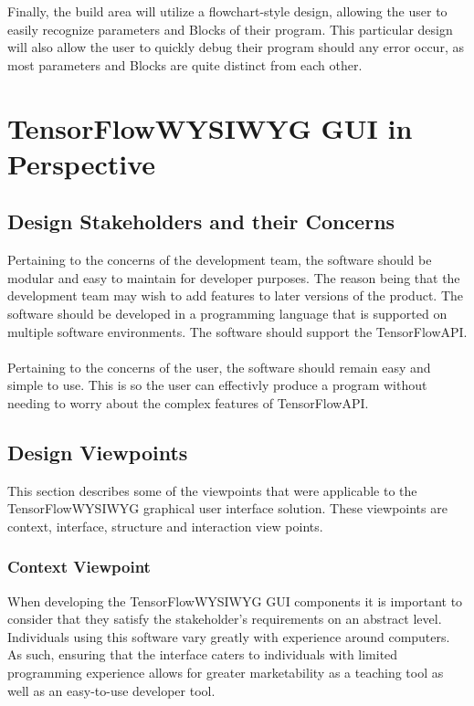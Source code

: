 \documentclass[journal,10pt,onecolumn,compsoc]{IEEEtran} \usepackage[margin=1.0in]{geometry} \usepackage{pdfpages}
\begin{document}
\noindent Finally, the build area will utilize a flowchart-style design, allowing the user to easily recognize parameters and Blocks of their program. 
This particular design will also allow the user to quickly debug their program should any error occur, as most parameters and Blocks are quite distinct from each other.
\newpage
\section{TensorFlow\texttrademark WYSIWYG GUI in Perspective}\label{TWYSIWYGGUI}
\subsection{Design Stakeholders and their Concerns}
\noindent Pertaining to the concerns of the development team, the software should be modular and easy to maintain for developer purposes. 
The reason being that the development team may wish to add features to later versions of the product.
The software should be developed in a programming language that is supported on multiple software environments.
The software should support the TensorFlow\texttrademark API.
\\ \\
\noindent Pertaining to the concerns of the user, the software should remain easy and simple to use. This is so the user can effectivly produce a program without needing to worry about the complex features of TensorFlow\texttrademark API. 
\subsection{Design Viewpoints}
This section describes some of the viewpoints that were applicable to the TensorFlow\texttrademark WYSIWYG graphical user interface solution. 
These viewpoints are context, interface, structure and interaction view points.

\subsubsection{Context Viewpoint}
\noindent When developing the TensorFlow\texttrademark WYSIWYG GUI components it is important to consider that they satisfy the stakeholder's requirements on an abstract level. 
Individuals using this software vary greatly with experience around computers. 
As such, ensuring that the interface caters to individuals with limited programming experience allows for greater marketability as a teaching tool as well as an easy-to-use developer tool.
\end{document}
